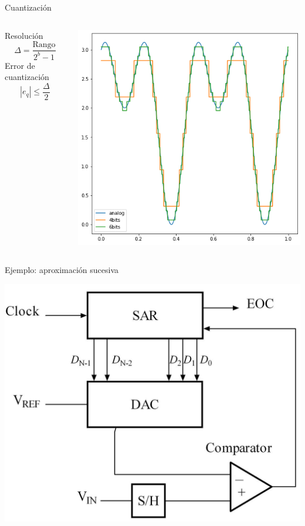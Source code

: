 \documentclass[aspectratio=169]{beamer}
\begin{document}
\begin{frame}{Cuantización}
    \begin{columns}
    \begin{column}{0.4\textwidth}
        \centering
        Resolución
        \begin{equation*}
            \Delta = \dfrac{\mathrm{Rango}}{2^b-1} 
        \end{equation*}
        Error de cuantización
        \begin{equation*}
            |e_q| \leq \dfrac{\Delta}{2} 
        \end{equation*}
    \end{column}
    \begin{column}{0.6\textwidth}
        \begin{center}
            \includegraphics[width=0.8\linewidth]{presentaciones/fig/resolution.png}  
        \end{center}
    \end{column}
    \end{columns}
\end{frame}


\begin{frame}{Ejemplo: aproximación sucesiva}
\begin{center}
    \includegraphics[width=0.5\linewidth]{presentaciones/fig/SAR.png}
\end{center}
\end{frame}
\end{document}
